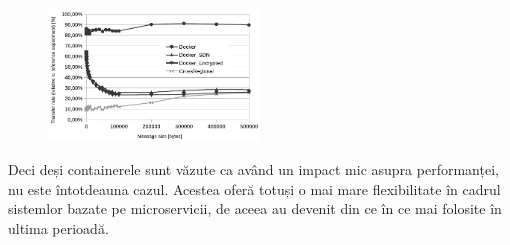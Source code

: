 \documentclass[12pt, a4paper, twocolumn]{article} %
\begin{document}
\begin{figure}[h]
\centering
\includegraphics[width=0.5\textwidth]{performance}
\end{figure}

\par Deci deși containerele sunt văzute ca având un impact mic asupra performanței, nu este întotdeauna cazul. Acestea oferă totuși o mai mare flexibilitate în cadrul sistemlor bazate pe microservicii, de aceea au devenit din ce în ce mai folosite în ultima perioadă.\citep{kratzke2017microservices}

\clearpage
\end{document}
